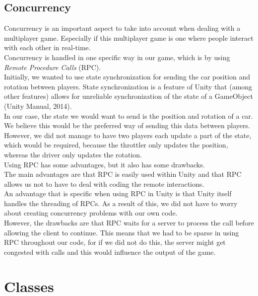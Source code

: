\documentclass[11pt,twoside,a4paper]{article}
\begin{document}
\subsection{Concurrency}
Concurrency is an important aspect to take into account when dealing with a multiplayer game. Especially if this multiplayer game is one where people interact with each other in real-time.\\
Concurrency is handled in one specific way in our game, which is by using \emph{Remote Procedure Calls} (RPC).\\
\newline
Initially, we wanted to use state synchronization for sending the car position and rotation between players. State synchronization is a feature of Unity that (among other features) allows  for unreliable synchronization of the state of a GameObject (Unity Manual, 2014).\\
In our case, the state we would want to send is the position and rotation of a car. We believe this would be the preferred way of sending this data between players. However, we did not manage to have two players each update a part of the state, which would be required, because the throttler only updates the position, whereas the driver only updates the rotation.\\
\newline
Using RPC has some advantages, but it also has some drawbacks.\\
The main advantages are that RPC is easily used within Unity and that RPC allows us not to have to deal with coding the remote interactions.\\
An advantage that is specific when using RPC in Unity is that Unity itself handles the threading of RPCs. As a result of this, we did not have to worry about creating concurrency problems with our own code.\\
However, the drawbacks are that RPC waits for a server to process the call before allowing the client to continue. This means that we had to be sparse in using RPC throughout our code, for if we did not do this, the server might get congested with calls and this would influence the output of the game.\\

\newpage

\section{Classes}
\end{document}
